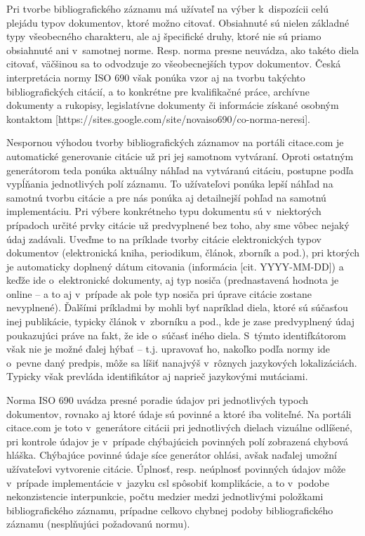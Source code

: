 \documentclass{fithesis3}
\begin{document}
	Pri tvorbe bibliografického záznamu má užívateľ na výber k~dispozícii celú plejádu typov dokumentov, ktoré možno citovať. Obsiahnuté sú nielen základné typy všeobecného charakteru, ale aj špecifické druhy, ktoré nie sú priamo obsiahnuté ani v~samotnej norme. Resp. norma presne neuvádza, ako takéto diela citovať, väčšinou sa to odvodzuje zo všeobecnejších typov dokumentov. Česká interpretácia normy ISO 690 však ponúka vzor aj na tvorbu takýchto bibliografických citácií, a to konkrétne pre kvalifikačné práce, archívne dokumenty a rukopisy, legislatívne dokumenty či informácie získané osobným kontaktom [https://sites.google.com/site/novaiso690/co-norma-neresi].
	
	Nespornou výhodou tvorby bibliografických záznamov na portáli citace.com je automatické generovanie citácie už pri jej samotnom vytváraní. Oproti ostatným generátorom teda ponúka aktuálny náhľad na vytváranú citáciu, postupne podľa vypĺňania jednotlivých polí záznamu. To užívateľovi ponúka lepší náhľad na samotnú tvorbu citácie a pre nás ponúka aj detailnejší pohľad na samotnú implementáciu. Pri výbere konkrétneho typu dokumentu sú v~niektorých prípadoch určité prvky citácie už predvyplnené bez toho, aby sme vôbec nejaký údaj zadávali. Uveďme to na príklade tvorby citácie elektronických typov dokumentov (elektronická kniha, periodikum, článok, zborník a pod.), pri ktorých je automaticky doplnený dátum citovania (informácia [cit. YYYY-MM-DD]) a keďže ide o~elektronické dokumenty, aj typ nosiča (prednastavená hodnota je online -- a to aj v~prípade ak pole typ nosiča pri úprave citácie zostane nevyplnené). Ďalšími príkladmi by mohli byť napríklad diela, ktoré sú súčasťou inej publikácie, typicky článok v~zborníku a pod., kde je zase predvyplnený údaj  poukazujúci práve na fakt, že ide o~súčasť iného diela. S~týmto identifkátorom však nie je možné ďalej hýbať -- t.j. upravovať ho, nakoľko podľa normy ide o~pevne daný predpis, môže sa líšiť nanajvýš v~rôznych jazykových lokalizáciách. Typicky však prevláda identifikátor  aj naprieč jazykovými mutáciami.
	
	Norma ISO 690 uvádza presné poradie údajov pri jednotlivých typoch dokumentov, rovnako aj ktoré údaje sú povinné a ktoré iba voliteľné. Na portáli citace.com je toto v~generátore citácii pri jednotlivých dielach vizuálne odlíšené, pri kontrole údajov je v~prípade chýbajúcich povinných polí zobrazená chybová hláška. Chýbajúce povinné údaje síce generátor ohlási, avšak naďalej umožní užívateľovi vytvorenie citácie. Úplnosť, resp. neúplnosť povinných údajov môže v~prípade implementácie v~jazyku csl spôsobiť komplikácie, a to v~podobe nekonzistencie interpunkcie, počtu medzier medzi jednotlivými položkami bibliografického záznamu, prípadne celkovo chybnej podoby bibliografického záznamu (nesplňujúci požadovanú normu).
	
\end{document}
